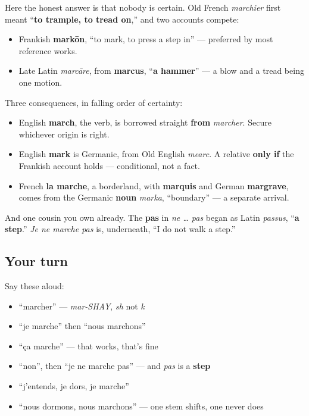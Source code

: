 \begin{cousinweb}
Here the honest answer is that nobody is certain. Old French \emph{marchier} first meant \textquotedblleft{}\textbf{to trample, to tread on},\textquotedblright{} and two accounts compete:

\begin{itemize}
\raggedright
  \item Frankish \textbf{markōn}, \textquotedblleft{}to mark, to press a step in\textquotedblright{} — preferred by most reference works.
  \item Late Latin \emph{marcāre}, from \textbf{marcus}, \textquotedblleft{}\textbf{a hammer}\textquotedblright{} — a blow and a tread being one motion.
\end{itemize}

Three consequences, in falling order of certainty:

\begin{itemize}
\raggedright
  \item English \textbf{march}, the verb, is borrowed straight \textbf{from} \emph{marcher}. Secure whichever origin is right.
  \item English \textbf{mark} is Germanic, from Old English \emph{mearc}. A relative \textbf{only if} the Frankish account holds — conditional, not a fact.
  \item French \textbf{la marche}, a borderland, with \textbf{marquis} and German \textbf{margrave}, comes from the Germanic \textbf{noun} \emph{marka}, \textquotedblleft{}boundary\textquotedblright{} — a separate arrival.
\end{itemize}

And one cousin you own already. The \textbf{pas} in \emph{ne … pas} began as Latin \emph{passus}, \textquotedblleft{}\textbf{a step}.\textquotedblright{} \emph{Je ne marche pas} is, underneath, \textquotedblleft{}I do not walk a step.\textquotedblright{}
\end{cousinweb}

\subsection*{Your turn}
Say these aloud:

\begin{itemize}
\raggedright
  \item \textquotedblleft{}marcher\textquotedblright{} — \emph{mar-SHAY}, \emph{sh} not \emph{k}
  \item \textquotedblleft{}je marche\textquotedblright{} then \textquotedblleft{}nous marchons\textquotedblright{}
  \item \textquotedblleft{}ça marche\textquotedblright{} — that works, that's fine
  \item \textquotedblleft{}non\textquotedblright{}, then \textquotedblleft{}je ne marche pas\textquotedblright{} — and \emph{pas} is a \textbf{step}
  \item \textquotedblleft{}j'entends, je dors, je marche\textquotedblright{}
  \item \textquotedblleft{}nous dormons, nous marchons\textquotedblright{} — one stem shifts, one never does
\end{itemize}

